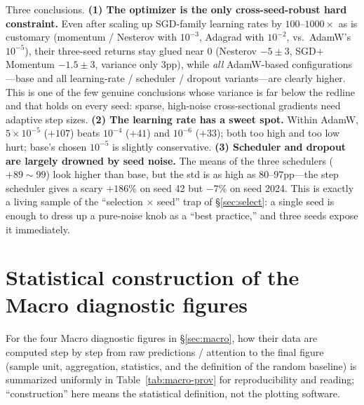 \documentclass[a4paper,11pt]{article}
\begin{document}
Three conclusions. \textbf{(1) The optimizer is the only cross-seed-robust
hard constraint.} Even after scaling up SGD-family learning rates by
$100$--$1000\times$ as is customary (momentum / Nesterov with $10^{-3}$,
Adagrad with $10^{-2}$, vs.\ AdamW's $10^{-5}$), their three-seed returns stay
glued near $0$ (Nesterov $-5\pm3$, SGD$+$Momentum $-1.5\pm3$, variance only
$3$pp), while \emph{all} AdamW-based configurations---base and all learning-rate
/ scheduler / dropout variants---are clearly higher. This is one of the few
genuine conclusions whose variance is far below the redline and that holds on
every seed: sparse, high-noise cross-sectional gradients need adaptive step
sizes. \textbf{(2) The learning rate has a sweet spot.} Within AdamW,
$5\times10^{-5}$ ($+107$) beats $10^{-4}$ ($+41$) and $10^{-6}$ ($+33$); both
too high and too low hurt; base's chosen $10^{-5}$ is slightly conservative.
\textbf{(3) Scheduler and dropout are largely drowned by seed noise.}
The means of the three schedulers ($+89\sim99$) look higher than base, but the
std is as high as $80$--$97$pp---the step scheduler gives a scary $+186\%$ on
seed 42 but $-7\%$ on seed 2024. This is exactly a living sample of the
``selection $\times$ seed'' trap of \S\ref{sec:select}: a single seed is enough
to dress up a pure-noise knob as a ``best practice,'' and three seeds expose it
immediately.

\section{Statistical construction of the Macro diagnostic figures}\label{sec:macro-prov}
For the four Macro diagnostic figures in \S\ref{sec:macro}, how their data are
computed step by step from raw predictions / attention to the final figure
(sample unit, aggregation, statistics, and the definition of the random
baseline) is summarized uniformly in Table~\ref{tab:macro-prov} for
reproducibility and reading; ``construction'' here means the statistical
definition, not the plotting software.
\end{document}
